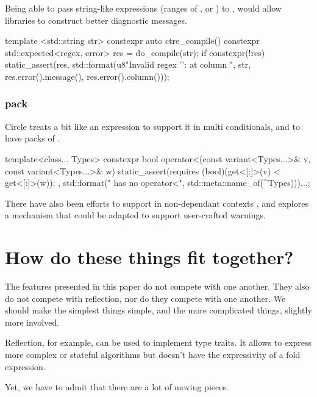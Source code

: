 \documentclass{wg21}
\begin{document}
Being able to pass string-like expressions (ranges of , or ) to ,
would allow libraries to construct better diagnostic messages.

\begin{colorblock}
template <std::string str>
constexpr auto ctre_compile() {
   constexpr std::expected<regex, error> res = do_compile(str);
   if constexpr(!res) {
       static_assert(res, std::format(u8"Invalid regex '{}': {} at column {}",
                                      str, res.error().message(), res.error().column()));
   }
}
\end{colorblock}

\subsubsection{ pack}
\label{sec:static_assert_pack}

Circle treats  a bit like an expression to support it in multi conditionals, and to have packs of .

\begin{colorblock}
template<class... Types>
constexpr bool operator<(const variant<Types...>& v,  const variant<Types...>& w) {
    static_assert(requires{ (bool)(get<[:]>(v) < get<[:]>(w)); },
        std::format("{} has no operator<", std::meta::name_of(^Types)))...;
}
\end{colorblock}

There have also been efforts to support  in non-dependant contexts ,
and  explores a mechanism that could be adapted to support user-crafted warnings.


\section{How do these things fit together?}

The features presented in this paper do not compete with one another. They also do not compete with reflection, nor do they compete with one another. We should make the simplest things simple, and the more complicated things, slightly more involved.

Reflection, for example, can be used to implement type traits. It allows to express more complex or stateful algorithms but doesn't have the expressivity of a fold expression.

Yet, we have to admit that there are a lot of moving pieces.
\end{document}
